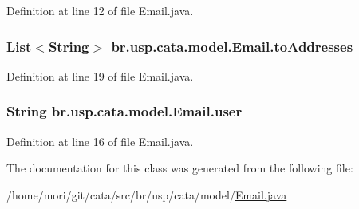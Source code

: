Definition at line 12 of file Email.\+java.

\hypertarget{classbr_1_1usp_1_1cata_1_1model_1_1_email_aa2dd2e6b3172d41d0b4af46e07687e0d}{
\subsubsection[{to\+Addresses}]{\setlength{\rightskip}{0pt plus 5cm}List$<$String$>$ br.\+usp.\+cata.\+model.\+Email.\+to\+Addresses\hspace{0.3cm}{\ttfamily [private]}}}\label{classbr_1_1usp_1_1cata_1_1model_1_1_email_aa2dd2e6b3172d41d0b4af46e07687e0d}


Definition at line 19 of file Email.\+java.

\hypertarget{classbr_1_1usp_1_1cata_1_1model_1_1_email_a3d21f816dce9038a65e12ff5476dda12}{
\subsubsection[{user}]{\setlength{\rightskip}{0pt plus 5cm}String br.\+usp.\+cata.\+model.\+Email.\+user\hspace{0.3cm}{\ttfamily [private]}}}\label{classbr_1_1usp_1_1cata_1_1model_1_1_email_a3d21f816dce9038a65e12ff5476dda12}


Definition at line 16 of file Email.\+java.



The documentation for this class was generated from the following file\+:\begin{DoxyCompactItemize}
\item 
/home/mori/git/cata/src/br/usp/cata/model/\hyperlink{_email_8java}{Email.\+java}\end{DoxyCompactItemize}

